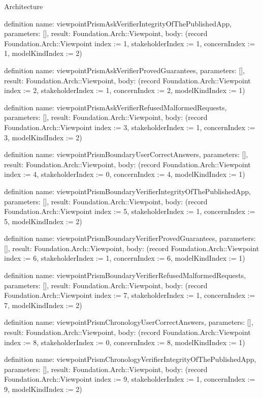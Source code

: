 \begin{lexlean}{Architecture}
\begin{semanticmodule}
definition{
  name: viewpointPrismAskVerifierIntegrityOfThePublishedApp,
  parameters: [],
  result: Foundation.Arch::Viewpoint,
  body: (record Foundation.Arch::Viewpoint {index := 1, stakeholderIndex := 1, concernIndex := 1, modelKindIndex := 2})
}

definition{
  name: viewpointPrismAskVerifierProvedGuarantees,
  parameters: [],
  result: Foundation.Arch::Viewpoint,
  body: (record Foundation.Arch::Viewpoint {index := 2, stakeholderIndex := 1, concernIndex := 2, modelKindIndex := 1})
}

definition{
  name: viewpointPrismAskVerifierRefusedMalformedRequests,
  parameters: [],
  result: Foundation.Arch::Viewpoint,
  body: (record Foundation.Arch::Viewpoint {index := 3, stakeholderIndex := 1, concernIndex := 3, modelKindIndex := 2})
}

definition{
  name: viewpointPrismBoundaryUserCorrectAnswers,
  parameters: [],
  result: Foundation.Arch::Viewpoint,
  body: (record Foundation.Arch::Viewpoint {index := 4, stakeholderIndex := 0, concernIndex := 4, modelKindIndex := 1})
}

definition{
  name: viewpointPrismBoundaryVerifierIntegrityOfThePublishedApp,
  parameters: [],
  result: Foundation.Arch::Viewpoint,
  body: (record Foundation.Arch::Viewpoint {index := 5, stakeholderIndex := 1, concernIndex := 5, modelKindIndex := 2})
}

definition{
  name: viewpointPrismBoundaryVerifierProvedGuarantees,
  parameters: [],
  result: Foundation.Arch::Viewpoint,
  body: (record Foundation.Arch::Viewpoint {index := 6, stakeholderIndex := 1, concernIndex := 6, modelKindIndex := 1})
}

definition{
  name: viewpointPrismBoundaryVerifierRefusedMalformedRequests,
  parameters: [],
  result: Foundation.Arch::Viewpoint,
  body: (record Foundation.Arch::Viewpoint {index := 7, stakeholderIndex := 1, concernIndex := 7, modelKindIndex := 2})
}

definition{
  name: viewpointPrismChronologyUserCorrectAnswers,
  parameters: [],
  result: Foundation.Arch::Viewpoint,
  body: (record Foundation.Arch::Viewpoint {index := 8, stakeholderIndex := 0, concernIndex := 8, modelKindIndex := 1})
}

definition{
  name: viewpointPrismChronologyVerifierIntegrityOfThePublishedApp,
  parameters: [],
  result: Foundation.Arch::Viewpoint,
  body: (record Foundation.Arch::Viewpoint {index := 9, stakeholderIndex := 1, concernIndex := 9, modelKindIndex := 2})
}


\end{semanticmodule}
\end{lexlean}

